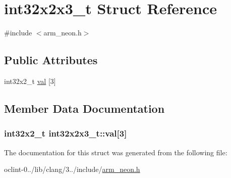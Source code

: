 \hypertarget{structint32x2x3__t}{\section{int32x2x3\-\_\-t Struct Reference}
\label{structint32x2x3__t}
}


{\ttfamily \#include $<$arm\-\_\-neon.\-h$>$}

\subsection*{Public Attributes}
\begin{DoxyCompactItemize}
\item 
int32x2\-\_\-t \hyperlink{structint32x2x3__t_a214e130c7ab80efa64569a494d01f087}{val} \mbox{[}3\mbox{]}
\end{DoxyCompactItemize}


\subsection{Member Data Documentation}
\hypertarget{structint32x2x3__t_a214e130c7ab80efa64569a494d01f087}{
\subsubsection[{val}]{\setlength{\rightskip}{0pt plus 5cm}int32x2\-\_\-t int32x2x3\-\_\-t\-::val\mbox{[}3\mbox{]}}}\label{structint32x2x3__t_a214e130c7ab80efa64569a494d01f087}


The documentation for this struct was generated from the following file\-:\begin{DoxyCompactItemize}
\item 
oclint-\/0../lib/clang/3../include/\hyperlink{arm__neon_8h}{arm\-\_\-neon.\-h}\end{DoxyCompactItemize}
